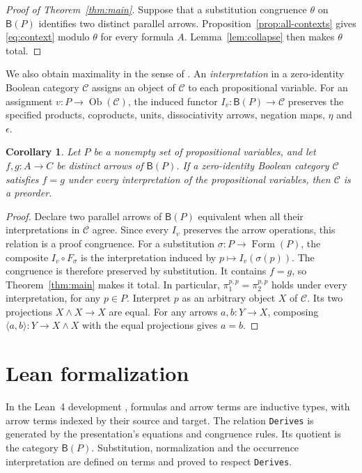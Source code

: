\documentclass[11pt]{article}
\newtheorem{corollary}[theorem]{Corollary}
\newcommand{\B}{\mathsf B}
\newcommand{\FormulaSet}{\operatorname{Form}}
\begin{document}
\begin{proof}[Proof of Theorem~\ref{thm:main}]
Suppose that a substitution congruence $\theta$ on $\B(P)$ identifies
two distinct parallel arrows. Proposition~\ref{prop:all-contexts}
gives \eqref{eq:context} modulo $\theta$ for every formula $A$.
Lemma~\ref{lem:collapse} then makes $\theta$ total.
\end{proof}

We also obtain maximality in the sense of
\cite[\S9.3, p.~194]{DP}. An \emph{interpretation} in a zero-identity
Boolean category $\mathcal C$ assigns an object of $\mathcal C$ to
each propositional variable. For an assignment
$v:P\to\operatorname{Ob}(\mathcal C)$, the induced functor
$I_v:\B(P)\to\mathcal C$ preserves the specified products, coproducts,
units, dissociativity arrows, negation maps, $\eta$ and $\epsilon$.

\begin{corollary}\label{cor:models}
Let $P$ be a nonempty set of propositional variables, and let
$f,g:A\to C$ be distinct arrows of $\B(P)$.
If a zero-identity Boolean category $\mathcal C$ satisfies $f=g$
under every interpretation of the propositional variables, then
$\mathcal C$ is a preorder.
\end{corollary}

\begin{proof}
Declare two parallel arrows of $\B(P)$ equivalent when all their
interpretations in $\mathcal C$ agree. Since every $I_v$ preserves
the arrow operations, this relation is a proof congruence. For a
substitution $\sigma:P\to\FormulaSet(P)$, the composite
$I_v\circ F_\sigma$ is the interpretation induced by
$p\mapsto I_v(\sigma(p))$. The congruence is therefore preserved
by substitution. It contains $f=g$, so
Theorem~\ref{thm:main} makes it total. In particular,
$\pi_1^{p,p}=\pi_2^{p,p}$ holds under every interpretation, for any
$p\in P$. Interpret $p$ as an arbitrary object $X$ of $\mathcal C$.
Its two projections $X\wedge X\to X$ are equal. For any arrows $a,b:Y\to X$, composing
$\langle a,b\rangle:Y\to X\wedge X$ with the equal projections gives $a=b$.
\end{proof}

\section{Lean formalization}\label{sec:formalization}

In the Lean~4 development \cite{Formalization}, formulas and arrow
terms are inductive types, with arrow terms indexed by their source
and target. The relation \texttt{Derives} is generated by the
presentation's equations and congruence rules. Its quotient is the
category $\B(P)$. Substitution, normalization and the occurrence
interpretation are defined on terms and proved to respect
\texttt{Derives}.
\end{document}
